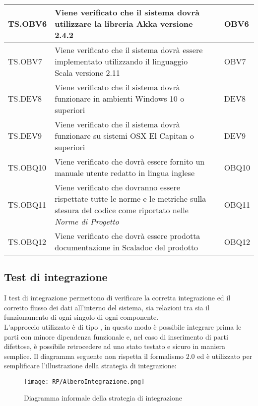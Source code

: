 \documentclass{scalatekids-article}
\begin{document}
\begin{center}
\begin{longtable}[H]{| l | p{10cm} | l | l |}
    \hline
    TS.OBV6 & Viene verificato che il sistema dovrà utilizzare la libreria Akka versione 2.4.2 & & OBV6\\
    \hline
    TS.OBV7 & Viene verificato che il sistema dovrà essere implementato utilizzando il linguaggio Scala versione 2.11 & & OBV7\\
    \hline
    TS.DEV8 & Viene verificato che il sistema dovrà funzionare in ambienti Windows 10 o superiori & & DEV8\\
    \hline
    TS.DEV9 & Viene verificato che il sistema dovrà funzionare su sistemi OSX El Capitan o superiori & & DEV9\\
    \hline
    TS.OBQ10 & Viene verificato che dovrà essere fornito un manuale utente redatto in lingua inglese & & OBQ10\\
    \hline
    TS.OBQ11 & Viene verificato che dovranno essere rispettate tutte le norme e le metriche sulla stesura del codice come riportato nelle \textit{Norme di Progetto} & & OBQ11\\
    \hline
    TS.OBQ12 & Viene verificato che dovrà essere prodotta documentazione in Scaladoc del prodotto & & OBQ12\\
    \hline
  \end{longtable}
\end{center}

\subsection{Test di integrazione}

I test di integrazione permettono di verificare la corretta integrazione ed il
corretto flusso dei dati all'interno del sistema, sia relazioni tra
 sia il funzionamento
di ogni singolo  di ogni componente.\\
L'approccio utilizzato è di tipo , in questo modo è possibile
integrare prima le parti con minore dipendenza funzionale e, nel caso di
inserimento di parti difettose, è possibile retrocedere ad uno stato testato e
sicuro in maniera semplice. Il diagramma seguente non rispetta il formalismo
 2.0 ed è utilizzato per semplificare l'illustrazione della strategia
di integrazione:
\begin{figure}[H]
  \begin{center}
    \texttt{[image: RP/AlberoIntegrazione.png]}
    \caption{Diagramma informale della strategia di integrazione}
  \end{center}
\end{figure}
\end{document}

